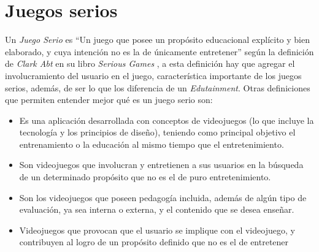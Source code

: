 \chapter{Juegos serios}
\label{chap:juegos_serios}



Un \emph{Juego Serio} es \enquote{Un juego que posee un propósito 
educacional explícito y bien elaborado, y cuya intención no es la de únicamente 
entretener} según la definición de \emph{Clark Abt} en su libro \emph{Serious Games}
\cite{abt1987serious}, a esta definición hay que agregar el involucramiento del 
usuario en el juego, característica importante de los juegos serios, además, de ser 
lo que los diferencia de un \emph{Edutainment}\cite{resnick:2004,charsky:2010}. Otras 
definiciones que permiten entender mejor qué es un juego serio son:

\begin{itemize}
    \item Es una aplicación desarrollada con conceptos de videojuegos (lo que
        incluye la tecnología y los principios de diseño), teniendo como
        principal objetivo el entrenamiento o la educación al mismo tiempo que
        el entretenimiento\cite{ludus:sg}.
    \item Son videojuegos que involucran y entretienen a sus usuarios en la
        búsqueda de un determinado propósito que no es el de puro
        entretenimiento\cite{ludus:sg}.
    \item Son los videojuegos que poseen pedagogía incluida, además de algún tipo de
        evaluación, ya sea interna o externa, y el contenido que se desea
        enseñar\cite{damien:sg,sg:aoverview}.
    \item Videojuegos que provocan que el usuario se implique con el videojuego, y
        contribuyen al logro de un propósito definido que no es el de
        entretener\cite{sg:aoverview}
\end{itemize}

